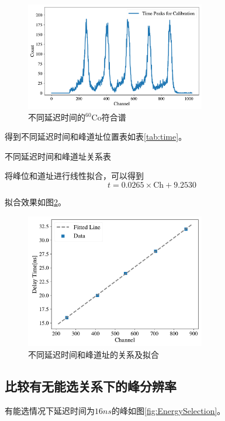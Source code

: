 \documentclass{article}
\begin{document}
\begin{figure}[htbp]
    \centering
    \includegraphics[width = 0.7\textwidth]{../plots/time.pdf}
    \caption{不同延迟时间的$^{60}\text{Co}$符合谱\label{fig:time}}
\end{figure}
得到不同延迟时间和峰道址位置表如表\ref{tab:time}。
\begin{table}[htbp]
    \centering
    \caption{不同延迟时间和峰道址关系表\label{tab:time}}
    
\end{table}

将峰位和道址进行线性拟合，可以得到
\begin{equation}
    t = 0.0265\times\text{Ch}+9.2530
\end{equation}

拟合效果如图\ref{fig:TimeCalibration}。

\begin{figure}[htbp]
    \centering
    \includegraphics[width = 0.7\textwidth]{../plots/TimeCalibration.pdf}
    \caption{不同延迟时间和峰道址的关系及拟合\label{fig:TimeCalibration}}
\end{figure}

\subsection{比较有无能选关系下的峰分辨率}
有能选情况下延迟时间为$16\si{ns}$的峰如图\ref{fig:EnergySelection}。
\end{document}
